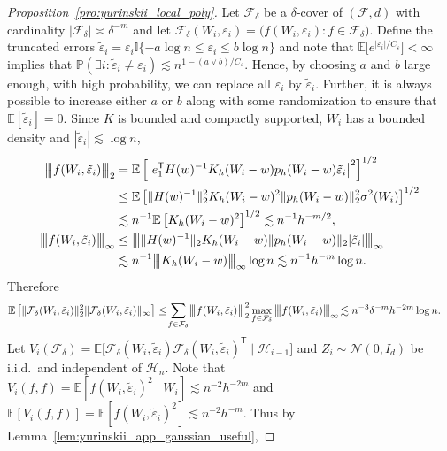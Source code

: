 \documentclass[11pt,lof]{puthesis}
\renewcommand{\P}{\ensuremath{\mathbb{P}}}
\newcommand{\E}{\ensuremath{\mathbb{E}}}
\newcommand{\I}{\ensuremath{\mathbb{I}}}
\newcommand{\cH}{\ensuremath{\mathcal{H}}}
\newcommand{\cF}{\ensuremath{\mathcal{F}}}
\newcommand{\cN}{\ensuremath{\mathcal{N}}}
\newcommand{\T}{\ensuremath{\mathsf{T}}}
\newcommand{\bigvvvert}{{\big\vert\kern-0.35ex\big\vert\kern-0.35ex\big\vert}}
\theoremstyle{break}
\theoremstyle{proof}
\newtheorem{proof}{Proof}
\begin{document}
\begin{proof}[Proposition~\ref{pro:yurinskii_local_poly}]
Let $\cF_\delta$ be a $\delta$-cover of $(\cF, d)$
with cardinality $|\cF_\delta| \asymp \delta^{-m}$
and let
$\cF_\delta(W_i, \varepsilon_i)
= \big(f(W_i, \varepsilon_i) : f\in \cF_\delta\big)$.
Define the truncated errors
$\tilde\varepsilon_i =
\varepsilon_i\I\{-a \log n \leq \varepsilon_i \leq b \log n\}$
and note that
$\E\big[e^{|\varepsilon_i|/C_\varepsilon}\big] < \infty$
implies that
$\P(\exists i: \tilde\varepsilon_i \neq \varepsilon_i)
\lesssim n^{1-(a \vee b)/C_\varepsilon}$.
Hence, by choosing $a$ and $b$ large enough,
with high probability, we can replace all
$\varepsilon_i$ by $\tilde\varepsilon_i$.
Further, it is always possible to increase either $a$ or $b$
along with some randomization to ensure that
$\E[\tilde\varepsilon_i] = 0$.
Since $K$ is bounded and compactly supported,
$W_i$ has a bounded density and
$|\tilde\varepsilon_i| \lesssim \log n$,
%
\begin{align*}
\bigvvvert
f(W_i, \tilde\varepsilon_i)
\bigvvvert_2
&=
\E\left[
\left|
e_1^\T H(w)^{-1} K_h(W_i-w) p_h(W_i-w)
\tilde\varepsilon_i
\right|^2
\right]^{1/2} \\
&\leq
\E\left[
\|H(w)^{-1}\|_2^2
K_h(W_i-w)^2
\|p_h(W_i-w)\|_2^2
\sigma^2(W_i)
\right]^{1/2} \\
&\lesssim
n^{-1}
\E\left[
K_h(W_i-w)^2
\right]^{1/2}
\lesssim
n^{-1}
h^{-m / 2}, \\
\bigvvvert
f(W_i, \tilde\varepsilon_i)
\bigvvvert_\infty
&\leq
\bigvvvert
\|H(w)^{-1}\|_2
K_h(W_i-w)
\|p_h(W_i-w)\|_2
|\tilde\varepsilon_i|
\bigvvvert_\infty \\
&\lesssim
n^{-1}
\bigvvvert
K_h(W_i-w)
\bigvvvert_\infty
\log n
\lesssim
n^{-1}
h^{-m}
\log n.
\end{align*}
%
Therefore
%
\begin{align*}
\E\left[
\|\cF_\delta(W_i, \tilde\varepsilon_i)\|_2^2
\|\cF_\delta(W_i, \tilde\varepsilon_i)\|_\infty
\right]
&\leq
\!\sum_{f\in\cF_\delta}
\!\bigvvvert f(W_i, \tilde\varepsilon_i) \bigvvvert_2^2
\max_{f\in\cF_\delta}
\bigvvvert f(W_i, \tilde\varepsilon_i) \bigvvvert_\infty
\!\lesssim
n^{-3} \delta^{-m} h^{-2m} \log n.
\end{align*}
%
Let
$V_i(\cF_\delta) =
\E\big[\cF_\delta(W_i, \tilde\varepsilon_i)
\cF_\delta(W_i, \tilde\varepsilon_i)^\T
\mid \cH_{i-1}\big]$
and $Z_i \sim \cN(0, I_d)$ be i.i.d.\ and
independent of $\cH_n$.
Note that
$V_i(f,f) = \E[f(W_i, \tilde\varepsilon_i)^2 \mid W_i]
\lesssim n^{-2} h^{-2m}$
and
$\E[V_i(f,f)] = \E[f(W_i, \tilde\varepsilon_i)^2]
\lesssim n^{-2} h^{-m}$.
Thus by Lemma~\ref{lem:yurinskii_app_gaussian_useful},

\end{proof}
\end{document}
